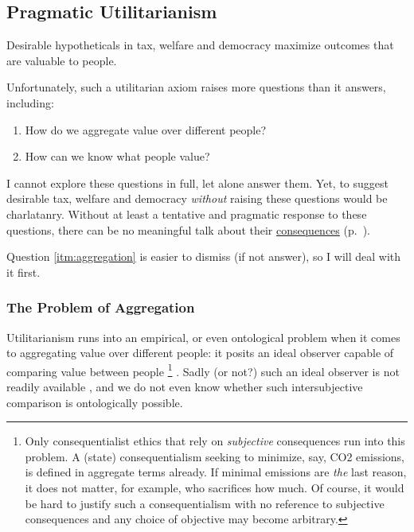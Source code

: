 \subsection[utilitarian]{Pragmatic Utilitarianism} \label{sec:utilitarian}%

Desirable hypotheticals in tax, welfare and democracy maximize outcomes that are valuable to people.

Unfortunately, such a utilitarian axiom raises more questions than 
it answers, including: 
\begin{enumerate}
	\item \label{itm:aggregation} How do we aggregate value over different people?
	\item \label{itm:utility} How can we know what people value?
\end{enumerate}
I cannot explore these questions in full, let alone answer them. 
Yet, to suggest desirable tax, welfare and democracy \emph{without} raising these questions would be charlatanry.
Without at least a tentative and pragmatic response to these questions, there can be no meaningful talk about their \hyperref[itm:consequentialism]{consequences} (p.~\pageref{itm:consequentialism}).

Question \ref{itm:aggregation} is easier to dismiss (if not answer), so I will deal with it first.

\subsubsection[Aggregation]{The Problem of Aggregation\label{sec:aggregation}} 

Utilitarianism runs into an empirical, or even ontological problem when it comes to aggregating value over different people: it posits an ideal observer capable of comparing value between people
\footnote{
	Only consequentialist ethics that rely on \emph{subjective} consequences run into this problem. 
	A (state) consequentialism seeking to minimize, say, CO2 emissions, is defined in aggregate terms already. 
	If minimal emissions are \emph{the} last reason, it does not matter, for example, who sacrifices how much.
	Of course, it would be hard to justify such a consequentialism with no reference to subjective consequences and any choice of objective may become arbitrary.
}
. 
Sadly (or not?) such an ideal observer is not readily available \citep{Rawls1988}, and we do not even know whether such intersubjective comparison is ontologically possible.

